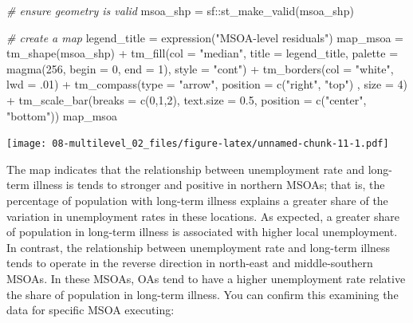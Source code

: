 \documentclass[
]{book}
\newenvironment{Shaded}{\begin{snugshade}}{\end{snugshade}}
\newcommand{\AttributeTok}[1]{\textcolor[rgb]{0.77,0.63,0.00}{#1}}
\newcommand{\CommentTok}[1]{\textcolor[rgb]{0.56,0.35,0.01}{\textit{#1}}}
\newcommand{\DecValTok}[1]{\textcolor[rgb]{0.00,0.00,0.81}{#1}}
\newcommand{\FloatTok}[1]{\textcolor[rgb]{0.00,0.00,0.81}{#1}}
\newcommand{\FunctionTok}[1]{\textcolor[rgb]{0.00,0.00,0.00}{#1}}
\newcommand{\NormalTok}[1]{#1}
\newcommand{\OtherTok}[1]{\textcolor[rgb]{0.56,0.35,0.01}{#1}}
\newcommand{\SpecialCharTok}[1]{\textcolor[rgb]{0.00,0.00,0.00}{#1}}
\newcommand{\StringTok}[1]{\textcolor[rgb]{0.31,0.60,0.02}{#1}}
\begin{document}
\begin{Shaded}
\begin{Highlighting}[]
\CommentTok{\# ensure geometry is valid}
\NormalTok{msoa\_shp }\OtherTok{=}\NormalTok{ sf}\SpecialCharTok{::}\FunctionTok{st\_make\_valid}\NormalTok{(msoa\_shp)}

\CommentTok{\# create a map}
\NormalTok{legend\_title }\OtherTok{=} \FunctionTok{expression}\NormalTok{(}\StringTok{"MSOA{-}level residuals"}\NormalTok{)}
\NormalTok{map\_msoa }\OtherTok{=} \FunctionTok{tm\_shape}\NormalTok{(msoa\_shp) }\SpecialCharTok{+}
  \FunctionTok{tm\_fill}\NormalTok{(}\AttributeTok{col =} \StringTok{"median"}\NormalTok{, }\AttributeTok{title =}\NormalTok{ legend\_title, }\AttributeTok{palette =} \FunctionTok{magma}\NormalTok{(}\DecValTok{256}\NormalTok{, }\AttributeTok{begin =} \DecValTok{0}\NormalTok{, }\AttributeTok{end =} \DecValTok{1}\NormalTok{), }\AttributeTok{style =} \StringTok{"cont"}\NormalTok{) }\SpecialCharTok{+} 
  \FunctionTok{tm\_borders}\NormalTok{(}\AttributeTok{col =} \StringTok{"white"}\NormalTok{, }\AttributeTok{lwd =}\NormalTok{ .}\DecValTok{01}\NormalTok{)  }\SpecialCharTok{+} 
  \FunctionTok{tm\_compass}\NormalTok{(}\AttributeTok{type =} \StringTok{"arrow"}\NormalTok{, }\AttributeTok{position =} \FunctionTok{c}\NormalTok{(}\StringTok{"right"}\NormalTok{, }\StringTok{"top"}\NormalTok{) , }\AttributeTok{size =} \DecValTok{4}\NormalTok{) }\SpecialCharTok{+} 
  \FunctionTok{tm\_scale\_bar}\NormalTok{(}\AttributeTok{breaks =} \FunctionTok{c}\NormalTok{(}\DecValTok{0}\NormalTok{,}\DecValTok{1}\NormalTok{,}\DecValTok{2}\NormalTok{), }\AttributeTok{text.size =} \FloatTok{0.5}\NormalTok{, }\AttributeTok{position =}  \FunctionTok{c}\NormalTok{(}\StringTok{"center"}\NormalTok{, }\StringTok{"bottom"}\NormalTok{)) }
\NormalTok{map\_msoa}
\end{Highlighting}
\end{Shaded}

\texttt{[image: 08-multilevel\_02\_files/figure-latex/unnamed-chunk-11-1.pdf]}

The map indicates that the relationship between unemployment rate and long-term illness is tends to stronger and positive in northern MSOAs; that is, the percentage of population with long-term illness explains a greater share of the variation in unemployment rates in these locations. As expected, a greater share of population in long-term illness is associated with higher local unemployment. In contrast, the relationship between unemployment rate and long-term illness tends to operate in the reverse direction in north-east and middle-southern MSOAs. In these MSOAs, OAs tend to have a higher unemployment rate relative the share of population in long-term illness. You can confirm this examining the data for specific MSOA executing:
\end{document}
